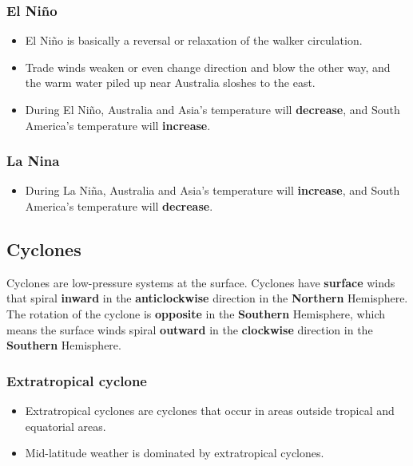 \documentclass[11pt]{article}
\begin{document}
\subsubsection{El Niño}
\label{sec:orgf984ee3}
\begin{itemize}
\item El Niño is basically a reversal or relaxation of the walker circulation.
\item Trade winds weaken or even change direction and blow the other way, and the warm water piled up near Australia sloshes to the east.
\item During El Niño, Australia and Asia's temperature will \textbf{decrease}, and South America's temperature will \textbf{increase}.
\end{itemize}

\subsubsection{La Nina}
\label{sec:orgfd9b9f0}
\begin{itemize}
\item During La Niña, Australia and Asia's temperature will \textbf{increase}, and South America's temperature will \textbf{decrease}.
\end{itemize}

\subsection{Cyclones}
\label{sec:org98b39b3}
Cyclones are low-pressure systems at the surface. Cyclones have \textbf{surface} winds that spiral \textbf{inward} in the \textbf{anticlockwise} direction in the \textbf{Northern} Hemisphere. The rotation of the cyclone is \textbf{opposite} in the \textbf{Southern} Hemisphere, which means the surface winds spiral \textbf{outward} in the \textbf{clockwise} direction in the \textbf{Southern} Hemisphere.

\subsubsection{Extratropical cyclone}
\label{sec:org5cb451a}
\begin{itemize}
\item Extratropical cyclones are cyclones that occur in areas outside tropical and equatorial areas.
\item Mid-latitude weather is dominated by extratropical cyclones.
\end{itemize}
\end{document}
